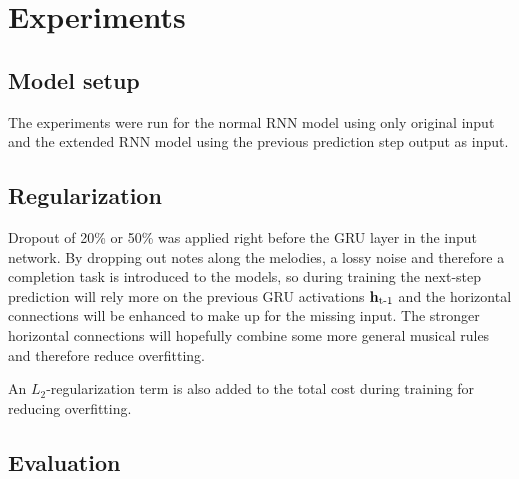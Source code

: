 \section{Experiments}
\label{sec:experiments}



\subsection{Model setup}

The experiments were run for the normal RNN model using only original input and the extended RNN model using the previous prediction step output as input. 



\subsection{Regularization} %
\label{sub:regularization}

Dropout of 20\% or 50\% was applied right before the GRU layer in the input network. By dropping out notes along the melodies, a lossy noise and therefore a completion task is introduced to the models, so during training the next-step prediction will rely more on the previous GRU activations $\bm{\mathrm{h}}_{\text{t-1}}$ and the horizontal connections will be enhanced to make up for the missing input. The stronger horizontal connections will hopefully combine some more general musical rules and therefore reduce overfitting. 

An $L_2$-regularization term is also added to the total cost during training for reducing overfitting.


\subsection{Evaluation}

